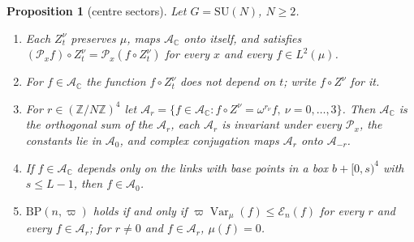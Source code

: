 \documentclass[aps,prd,twocolumn,superscriptaddress,nofootinbib,longbibliography,floatfix,amsmath,amssymb,10pt]{revtex4-2}
\newtheorem{proposition}[theorem]{Proposition}
\theoremstyle{definition}
\theoremstyle{remark}
\newcommand{\Z}{\mathbb{Z}}
\newcommand{\C}{\mathbb{C}}
\newcommand{\SU}{\mathrm{SU}}
\newcommand{\Var}{\operatorname{Var}}
\begin{document}
\begin{proposition}[centre sectors]\label{prop:bpcentre}
Let $G=\SU(N)$, $N\ge2$.
\begin{enumerate}[label=\textup{(\roman*)},leftmargin=*]
\item Each $Z^\nu_t$ preserves $\mu$, maps $\mathcal A_\C$ onto itself, and
satisfies $(\mathcal P_xf)\circ Z^\nu_t=\mathcal P_x(f\circ Z^\nu_t)$ for
every $x$ and every $f\in L^2(\mu)$.
\item For $f\in\mathcal A_\C$ the function $f\circ Z^\nu_t$ does not depend
on $t$; write $f\circ Z^\nu$ for it.
\item For $r\in(\Z/N\Z)^4$ let $\mathcal A_r=\{f\in\mathcal A_\C:f\circ Z^\nu
=\omega^{r_\nu}f,\ \nu=0,\dots,3\}$. Then $\mathcal A_\C$ is the orthogonal
sum of the $\mathcal A_r$, each $\mathcal A_r$ is invariant under every
$\mathcal P_x$, the constants lie in $\mathcal A_0$, and complex conjugation
maps $\mathcal A_r$ onto $\mathcal A_{-r}$.
\item If $f\in\mathcal A_\C$ depends only on the links with base points in a
box $b+[0,s)^4$ with $s\le L-1$, then $f\in\mathcal A_0$.
\item $\mathrm{BP}(n,\varpi)$ holds if and only if $\varpi\Var_\mu(f)\le
\mathcal E_n(f)$ for every $r$ and every $f\in\mathcal A_r$; for $r\ne0$ and
$f\in\mathcal A_r$, $\mu(f)=0$.
\end{enumerate}
\end{proposition}
\end{document}
